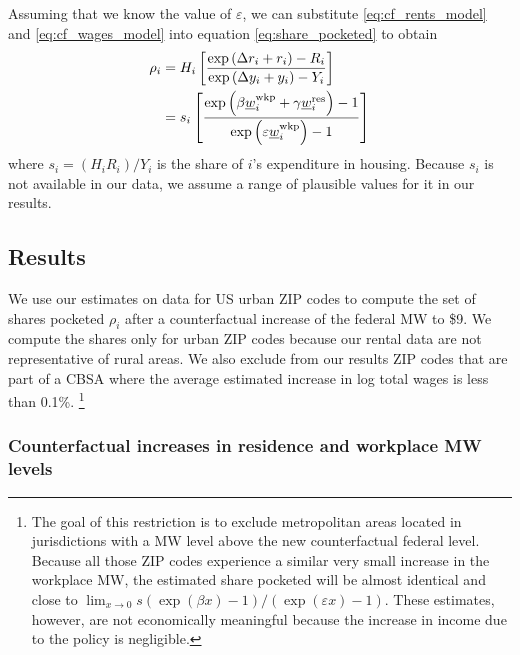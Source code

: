 Assuming that we know the value of $\varepsilon$, we can substitute
\eqref{eq:cf_rents_model} and \eqref{eq:cf_wages_model} into equation
\eqref{eq:share_pocketed} to obtain
\begin{equation}\label{eq:rho}
    \begin{split}
        \rho_i & = H_i \left[ 
        \frac{\exp \left(\Delta r_i + r_i \right) - R_i }
             {\exp \left(\Delta y_i + y_i \right) - Y_i }
        \right] \\
        & = s_i \left[
            \frac{\exp \left( \beta \underline{w}_i^{\text{wkp}} + \gamma \underline{w}_i^{\text{res}} \right) - 1 }
                {\exp \left( \varepsilon \underline{w}_i^{\text{wkp}} \right) - 1 }
            \right]
    \end{split}
\end{equation}
where $s_i = \left(H_i R_i\right)/Y_i$ is the share of $i$'s expenditure in 
housing.
Because $s_i$ is not available in our data, we assume a range of plausible 
values for it in our results.

\subsection{Results}\label{sec:results_cf}

We use our estimates on data for US urban ZIP codes to compute the set of
shares pocketed ${\rho_i}$ after a counterfactual increase of the federal 
MW to \$9.
We compute the shares only for urban ZIP codes because our rental data are not 
representative of rural areas.
We also exclude from our results ZIP codes that are part of a CBSA where the
average estimated increase in log total wages is less than 0.1\%.%
\footnote{\label{foot:restriction_on_zipcodes}
The goal of this restriction is to exclude metropolitan areas located 
in jurisdictions with a MW level above the new counterfactual federal level.
Because all those ZIP codes experience a similar very small increase in 
the workplace MW, the estimated share pocketed will be almost identical and 
close to 
$\lim_{x\to 0} s \left(\exp(\beta x)-1\right)/\left(\exp(\varepsilon x)-1\right)$.
These estimates, however, are not economically meaningful because the increase
in income due to the policy is negligible.}

\subsubsection*{Counterfactual increases in residence and workplace MW levels}
\label{sec:cf_res_and_wkp_changes}

